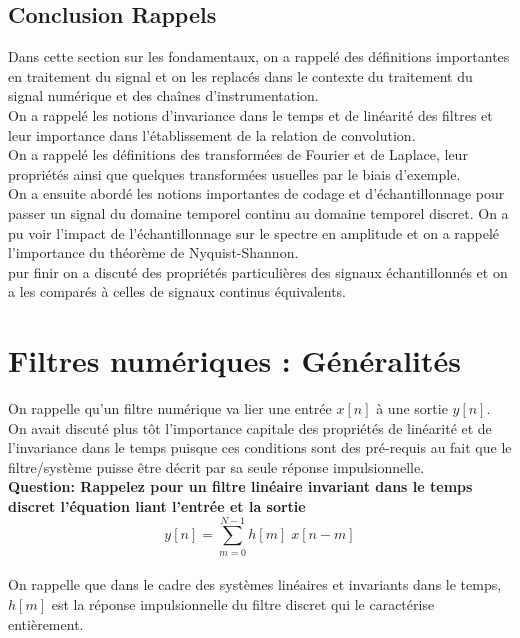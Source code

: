 \documentclass[11pt,a4paper]{article}
\begin{document}
\subsection{Conclusion Rappels}
Dans cette section sur les fondamentaux, on a rappelé des définitions importantes en traitement du signal et on les replacés dans le contexte du traitement du signal numérique et des chaînes d'instrumentation.\\

On a rappelé les notions d'invariance dans le temps et de linéarité des filtres et leur importance dans l'établissement de la relation de convolution.\\

On a rappelé les définitions des transformées de Fourier et de Laplace, leur propriétés ainsi que quelques transformées usuelles par le biais d'exemple.\\

On a ensuite abordé les notions importantes de codage et d'échantillonnage pour passer un signal du domaine temporel continu au domaine temporel discret. On a pu voir l'impact de l'échantillonnage sur le spectre en amplitude et on a rappelé l'importance du théorème de Nyquist-Shannon. \\

pur finir on a discuté des propriétés particulières des signaux échantillonnés et on a les comparés à celles de signaux continus équivalents.\\

\section{Filtres numériques : Généralités}
On rappelle qu'un filtre numérique va lier une entrée $x[n]$ à une sortie $y[n]$. On avait discuté plus tôt l'importance capitale des propriétés de linéarité et de l'invariance dans le temps puisque ces conditions sont des pré-requis au fait que le filtre/système puisse être décrit par sa seule réponse impulsionnelle.\\

\textbf{Question: Rappelez pour un filtre linéaire invariant dans le temps discret l'équation liant l'entrée et la sortie}\\

\[ y[n] = \sum_{m = 0}^{N-1} h[m]\; x[n-m] \]\\

On rappelle que dans le cadre des systèmes linéaires et invariants dans le temps, $h[m]$ est la réponse impulsionnelle du filtre discret qui le caractérise entièrement.
\end{document}
